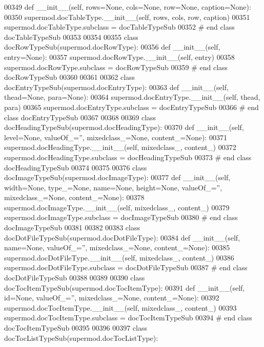 \begin{DoxyCode}
00349     \textcolor{keyword}{def }__init__(self, rows=None, cols=None, row=None, caption=None):
00350         supermod.docTableType.\_\_init\_\_(self, rows, cols, row, caption)
00351 supermod.docTableType.subclass = docTableTypeSub
00352 \textcolor{comment}{# end class docTableTypeSub}
00353 
00354 
00355 \textcolor{keyword}{class }docRowTypeSub(supermod.docRowType):
00356     \textcolor{keyword}{def }__init__(self, entry=None):
00357         supermod.docRowType.\_\_init\_\_(self, entry)
00358 supermod.docRowType.subclass = docRowTypeSub
00359 \textcolor{comment}{# end class docRowTypeSub}
00360 
00361 
00362 \textcolor{keyword}{class }docEntryTypeSub(supermod.docEntryType):
00363     \textcolor{keyword}{def }__init__(self, thead=None, para=None):
00364         supermod.docEntryType.\_\_init\_\_(self, thead, para)
00365 supermod.docEntryType.subclass = docEntryTypeSub
00366 \textcolor{comment}{# end class docEntryTypeSub}
00367 
00368 
00369 \textcolor{keyword}{class }docHeadingTypeSub(supermod.docHeadingType):
00370     \textcolor{keyword}{def }__init__(self, level=None, valueOf\_='', mixedclass\_=None, content\_=None):
00371         supermod.docHeadingType.\_\_init\_\_(self, mixedclass\_, content\_)
00372 supermod.docHeadingType.subclass = docHeadingTypeSub
00373 \textcolor{comment}{# end class docHeadingTypeSub}
00374 
00375 
00376 \textcolor{keyword}{class }docImageTypeSub(supermod.docImageType):
00377     \textcolor{keyword}{def }__init__(self, width=None, type\_=None, name=None, height=None, valueOf\_='', mixedclass\_=None, 
      content\_=None):
00378         supermod.docImageType.\_\_init\_\_(self, mixedclass\_, content\_)
00379 supermod.docImageType.subclass = docImageTypeSub
00380 \textcolor{comment}{# end class docImageTypeSub}
00381 
00382 
00383 \textcolor{keyword}{class }docDotFileTypeSub(supermod.docDotFileType):
00384     \textcolor{keyword}{def }__init__(self, name=None, valueOf\_='', mixedclass\_=None, content\_=None):
00385         supermod.docDotFileType.\_\_init\_\_(self, mixedclass\_, content\_)
00386 supermod.docDotFileType.subclass = docDotFileTypeSub
00387 \textcolor{comment}{# end class docDotFileTypeSub}
00388 
00389 
00390 \textcolor{keyword}{class }docTocItemTypeSub(supermod.docTocItemType):
00391     \textcolor{keyword}{def }__init__(self, id=None, valueOf\_='', mixedclass\_=None, content\_=None):
00392         supermod.docTocItemType.\_\_init\_\_(self, mixedclass\_, content\_)
00393 supermod.docTocItemType.subclass = docTocItemTypeSub
00394 \textcolor{comment}{# end class docTocItemTypeSub}
00395 
00396 
00397 \textcolor{keyword}{class }docTocListTypeSub(supermod.docTocListType):

\end{DoxyCode}
